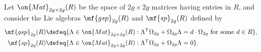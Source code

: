 Let $\on{Mat}_{2g \times 2g}(R)$ be the space of $2g \times 2g$ matrices having entries in $R$, and consider the Lie algebras $\mf{gsp}_{2g}(R)$ and $\mf{sp}_{2g}(R)$ defined by 
		\begin{align*}
        \mf{gsp}_{2g}(R) &\defeq \{\Lambda \in \on{Mat}_{2g \times 2g}(R) : \Lambda^T \Omega_{2g} + \Omega_{2g} \Lambda = d \cdot \Omega_{2g} \text{ for some } d \in R \}, \\
			\mf{sp}_{2g}(R) &\defeq \{\Lambda \in \on{Mat}_{2g \times 2g}(R) : \Lambda^T \Omega_{2g} + \Omega_{2g} \Lambda = 0 \}. 
		\end{align*} 

